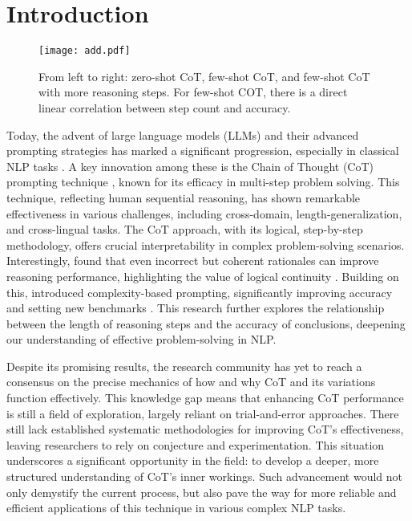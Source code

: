 \section{Introduction}
\columnbreak
\begin{figure}[t]
    \centering
    \texttt{[image: add.pdf]}
    \caption{From left to right: zero-shot CoT, few-shot CoT, and few-shot CoT with more reasoning steps. For few-shot COT, there is a direct linear correlation between step count and accuracy.}
    \label{fig:steps-connection-with-accuracy}
\end{figure}

Today, the advent of large language models (LLMs) and their advanced prompting strategies has marked a significant progression, especially in classical NLP tasks \cite{kojima2023large,wei2022chain,shao2023synthetic,lyu2023faithful, jin2024exploring}. A key innovation among these is the Chain of Thought (CoT) prompting technique \cite{kojima2023large,wang2023selfconsistency,zhang2022automatic}, known for its efficacy in multi-step problem solving. This technique, reflecting human sequential reasoning, has shown remarkable effectiveness in various challenges, including cross-domain, length-generalization, and cross-lingual tasks. The CoT approach, with its logical, step-by-step methodology, offers crucial interpretability in complex problem-solving scenarios. Interestingly, \citeauthor{wang2023selfconsistency} found that even incorrect but coherent rationales can improve reasoning performance, highlighting the value of logical continuity \cite{wang2023selfconsistency}. Building on this, \citeauthor{fu2023complexitybased} introduced complexity-based prompting, significantly improving accuracy and setting new benchmarks \cite{fu2023complexitybased}. This research further explores the relationship between the length of reasoning steps and the accuracy of conclusions, deepening our understanding of effective problem-solving in NLP.

Despite its promising results, the research community has yet to reach a consensus on the precise mechanics of how and why CoT and its variations function effectively. This knowledge gap means that enhancing CoT performance is still a field of exploration, largely reliant on trial-and-error approaches. There still lack established systematic methodologies for improving CoT's effectiveness, leaving researchers to rely on conjecture and experimentation. This situation underscores a significant opportunity in the field: to develop a deeper, more structured understanding of CoT's inner workings. Such advancement would not only demystify the current process, but also pave the way for more reliable and efficient applications of this technique in various complex NLP tasks.


